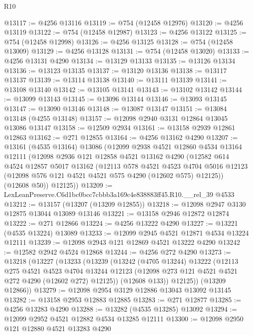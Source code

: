 \begin{lexlean}{R10}
\begin{coremodule}
@13117 := @4256 @13116
@13119 := @754 (@12458 @12976)
@13120 := @4256 @13119
@13122 := @754 (@12458 @12987)
@13123 := @4256 @13122
@13125 := @754 (@12458 @12998)
@13126 := @4256 @13125
@13128 := @754 (@12458 @13009)
@13129 := @4256 @13128
@13131 := @754 (@12458 @13020)
@13133 := @4256 @13131 @4290
@13134 := @13129 @13133
@13135 := @13126 @13134
@13136 := @13123 @13135
@13137 := @13120 @13136
@13138 := @13117 @13137
@13139 := @13114 @13138
@13140 := @13111 @13139
@13141 := @13108 @13140
@13142 := @13105 @13141
@13143 := @13102 @13142
@13144 := @13099 @13143
@13145 := @13096 @13144
@13146 := @13093 @13145
@13147 := @13090 @13146
@13148 := @13087 @13147
@13151 := @13084 @13148 (@4255 @13148)
@13157 := @12098 @2940 @3131 @12864 @13045 @13086 @13147
@13158 := @12509 @2934
@13161 := @13158 @2939 @12861 @12863
@13162 := @271 @12855
@13164 := @4256 @13162 @4290
@13207 := @13161
    (@4535 @13164)
    @13086
    (@12099
      @2938
      @4521
      @12860
      @4534
      @13164
      @12111
      (@12098
        @2936
        @121
        @12858
        @4521
        @13162
        @4290
        (@12582
          @614
          @4524
          @12857
          @5017
          @13162
          (@12113
            @578
            @4521
            @4523
            @4704
            @5016
            @12123
            (@12098 @576 @121 @4521 @4521 @575 @4290 (@12602 @575) @12125))
          (@12608 @50))
        @12125))
@13209 := LexLeanPreserve.C6d1bc0bcc7cbbb3a169c4e838883ff45.R10.__rel_39 @4533
@13212 := @13157 (@13207 (@13209 @12855))
@13218 := @12098 @2947 @3130 @12875 @13044 @13089 @13146
@13221 := @13158 @2946 @12872 @12874
@13222 := @271 @12866
@13224 := @4256 @13222 @4290
@13227 := @13221 (@4535 @13224) @13089
@13233 := @12099 @2945 @4521 @12871 @4534 @13224 @12111
@13239 := @12098 @2943 @121 @12869 @4521 @13222 @4290
@13242 := @12582 @2942 @4524 @12868
@13244 := @4256 @272 @4290
@13273 := @13218
    (@13227
      (@13233
        (@13239
          (@13242
            (@4705 @13244)
            @13222
            (@12113
              @275
              @4521
              @4523
              @4704
              @13244
              @12123
              (@12098 @273 @121 @4521 @4521 @272 @4290 (@12602 @272) @12125))
            (@12608 @133))
          @12125))
      (@13209 @12866))
@13279 := @12098 @2954 @3129 @12886 @13043 @13092 @13145
@13282 := @13158 @2953 @12883 @12885
@13283 := @271 @12877
@13285 := @4256 @13283 @4290
@13288 := @13282 (@4535 @13285) @13092
@13294 := @12099 @2952 @4521 @12882 @4534 @13285 @12111
@13300 := @12098 @2950 @121 @12880 @4521 @13283 @4290

\end{coremodule}
\end{lexlean}
